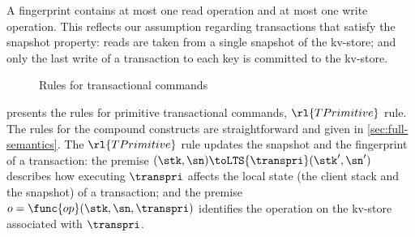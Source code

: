 \noindent 
A fingerprint contains at most one read operation and at most one write operation. 
This reflects our assumption regarding transactions that satisfy the snapshot property: reads are taken from a single snapshot of the kv-store;
and only the last write of a transaction to each key is committed to the kv-store.
\begin{figure*}[!t]
\begin{center}
\end{center}

\spaceshrink{-10pt}

\hrulefill

\caption{Rules for transactional commands}
\spaceshrink{-3pt}
\label{fig:semantics-trans}
\end{figure*}

 presents the rules for primitive transactional commands, \( \rl{TPrimitive} \) rule. 
The rules for the compound constructs are straightforward and given in \cref{sec:full-semantics}.
The \( \rl{TPrimitive} \) rule updates 
the snapshot and the fingerprint of a transaction: the premise 
$(\stk, \sn) \toLTS{\transpri} (\stk', \sn')$ describes how executing
$\transpri$ affects the local state (the client stack and the snapshot)
of a transaction; and the premise $o =\func{op}(\stk, \sn, \transpri)$ identifies the operation on the 
kv-store associated with $\transpri$. 

